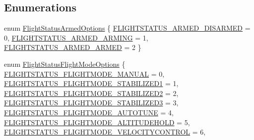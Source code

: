 \subsection*{\-Enumerations}
\begin{DoxyCompactItemize}
\item 
enum \hyperlink{group___flight_status_ga5dc78ee3624e05a61abe005a977be474}{\-Flight\-Status\-Armed\-Options} \{ \hyperlink{group___flight_status_gga5dc78ee3624e05a61abe005a977be474a05f82fcc3793ca6f231b6d05dc9e7eac}{\-F\-L\-I\-G\-H\-T\-S\-T\-A\-T\-U\-S\-\_\-\-A\-R\-M\-E\-D\-\_\-\-D\-I\-S\-A\-R\-M\-E\-D} = 0, 
\hyperlink{group___flight_status_gga5dc78ee3624e05a61abe005a977be474a26a9ce033e1c29ee296fcedf0cb4f374}{\-F\-L\-I\-G\-H\-T\-S\-T\-A\-T\-U\-S\-\_\-\-A\-R\-M\-E\-D\-\_\-\-A\-R\-M\-I\-N\-G} = 1, 
\hyperlink{group___flight_status_gga5dc78ee3624e05a61abe005a977be474a70b272e8b07281946a4d87c127217ee0}{\-F\-L\-I\-G\-H\-T\-S\-T\-A\-T\-U\-S\-\_\-\-A\-R\-M\-E\-D\-\_\-\-A\-R\-M\-E\-D} = 2
 \}
\item 
enum \hyperlink{group___flight_status_ga72d8d10af826df243cd0d1f47a66f903}{\-Flight\-Status\-Flight\-Mode\-Options} \{ \*
\hyperlink{group___flight_status_gga72d8d10af826df243cd0d1f47a66f903a98222faa8d1737ad78dea29cb5507701}{\-F\-L\-I\-G\-H\-T\-S\-T\-A\-T\-U\-S\-\_\-\-F\-L\-I\-G\-H\-T\-M\-O\-D\-E\-\_\-\-M\-A\-N\-U\-A\-L} = 0, 
\hyperlink{group___flight_status_gga72d8d10af826df243cd0d1f47a66f903af2944ed0ba5f2f672c442eaef015f906}{\-F\-L\-I\-G\-H\-T\-S\-T\-A\-T\-U\-S\-\_\-\-F\-L\-I\-G\-H\-T\-M\-O\-D\-E\-\_\-\-S\-T\-A\-B\-I\-L\-I\-Z\-E\-D1} = 1, 
\hyperlink{group___flight_status_gga72d8d10af826df243cd0d1f47a66f903aed6dfcc8e69fa869da28647c4f78507c}{\-F\-L\-I\-G\-H\-T\-S\-T\-A\-T\-U\-S\-\_\-\-F\-L\-I\-G\-H\-T\-M\-O\-D\-E\-\_\-\-S\-T\-A\-B\-I\-L\-I\-Z\-E\-D2} = 2, 
\hyperlink{group___flight_status_gga72d8d10af826df243cd0d1f47a66f903a12b2487486f907adbead14a08db1f546}{\-F\-L\-I\-G\-H\-T\-S\-T\-A\-T\-U\-S\-\_\-\-F\-L\-I\-G\-H\-T\-M\-O\-D\-E\-\_\-\-S\-T\-A\-B\-I\-L\-I\-Z\-E\-D3} = 3, 
\*
\hyperlink{group___flight_status_gga72d8d10af826df243cd0d1f47a66f903a44a26563d44197e9351f187b7feababf}{\-F\-L\-I\-G\-H\-T\-S\-T\-A\-T\-U\-S\-\_\-\-F\-L\-I\-G\-H\-T\-M\-O\-D\-E\-\_\-\-A\-U\-T\-O\-T\-U\-N\-E} = 4, 
\hyperlink{group___flight_status_gga72d8d10af826df243cd0d1f47a66f903a6b2d851027106d3735bee6512ec6f676}{\-F\-L\-I\-G\-H\-T\-S\-T\-A\-T\-U\-S\-\_\-\-F\-L\-I\-G\-H\-T\-M\-O\-D\-E\-\_\-\-A\-L\-T\-I\-T\-U\-D\-E\-H\-O\-L\-D} = 5, 
\hyperlink{group___flight_status_gga72d8d10af826df243cd0d1f47a66f903a31a6bfe60a14782746ae10b67e9a57a8}{\-F\-L\-I\-G\-H\-T\-S\-T\-A\-T\-U\-S\-\_\-\-F\-L\-I\-G\-H\-T\-M\-O\-D\-E\-\_\-\-V\-E\-L\-O\-C\-I\-T\-Y\-C\-O\-N\-T\-R\-O\-L} = 6, 

\end{DoxyCompactItemize}
